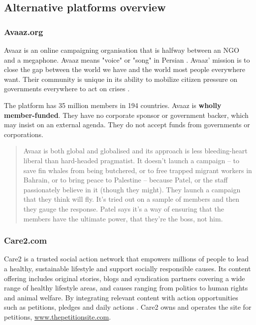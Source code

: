 \subsection{Alternative platforms overview}
\subsubsection*{Avaaz.org}
Avaaz is an online campaigning organisation that is halfway between an NGO and a megaphone. Avaaz means "voice" or "song" in Persian \citep{Butler2013}.
Avaaz' mission is to close the gap between the world we have and the world most people everywhere want. Their community is unique in its ability to mobilize citizen pressure on governments everywhere to act on crises \citep{Avaaz2011}.\par\vspace{0.2cm}

The platform has 35 million members in 194 countries. Avaaz is \textbf{wholly member-funded}. They have no corporate sponsor or government backer, which may insist on an external agenda. They do not accept funds from governments or corporations.
\begin{quote}
Avaaz is both global and globalised and its approach is less bleeding-heart liberal than hard-headed pragmatist. It doesn't launch a campaign – to save fin whales from being butchered, or to free trapped migrant workers in Bahrain, or to bring peace to Palestine – because Patel, or the staff passionately believe in it (though they might). They launch a campaign that they think will fly. It's tried out on a sample of members and then they gauge the response. Patel says it's a way of ensuring that the members have the ultimate power, that they're the boss, not him.
\citep{Cadwalladr2013}
\end{quote}

\subsubsection*{Care2.com}
Care2 is a trusted social action network that empowers millions of people to lead a healthy, sustainable lifestyle and support socially responsible causes. Its content offering includes original stories, blogs and syndication partners covering a wide range of healthy lifestyle areas, and causes ranging from politics to human rights and animal welfare. By integrating relevant content with action opportunities such as petitions, pledges and daily actions \citep{Care22014}. Care2 owns and operates the site for petitions, \url{www.thepetitionsite.com}.\par\vspace{0.2cm}

